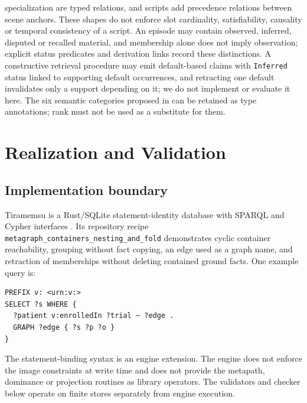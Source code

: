 \documentclass[11pt]{article}
\theoremstyle{plain}
\theoremstyle{definition}
\theoremstyle{remark}
\newcommand{\iri}[1]{\texttt{#1}}
\begin{document}
specialization are typed relations, and scripts add precedence relations between scene
anchors. These shapes do not enforce slot cardinality, satisfiability, causality or
temporal consistency of a script. An episode may contain observed, inferred, disputed or
recalled material, and membership alone does not imply observation; explicit status
predicates and derivation links record these distinctions. A constructive retrieval
procedure may emit default-based claims with \iri{Inferred} status linked to supporting
default occurrences, and retracting one default invalidates only a support depending on it;
we do not implement or evaluate it here. The six semantic categories proposed in
\cite{pavlyshyn2026metagraph} can be retained as type annotations; rank must not be used as
a substitute for them.

\section{Realization and Validation}\label{sec:evidence}
\subsection{Implementation boundary}
Tiramemsu is a Rust/SQLite statement-identity database with SPARQL and Cypher interfaces
\cite{pavlyshyn2026lbg}. Its repository recipe
\texttt{metagraph\_containers\_nesting\_and\_fold} demonstrates cyclic container
reachability, grouping without fact copying, an edge used as a graph name, and retraction
of memberships without deleting contained ground facts. One example query is:
\begin{verbatim}
PREFIX v: <urn:v:>
SELECT ?s WHERE {
  ?patient v:enrolledIn ?trial ~ ?edge .
  GRAPH ?edge { ?s ?p ?o }
}
\end{verbatim}
The statement-binding syntax is an engine extension. The engine does not enforce the image
constraints at write time and does not provide the metapath, dominance or projection
routines as library operators. The validators and checker below operate on finite stores
separately from engine execution.
\end{document}
